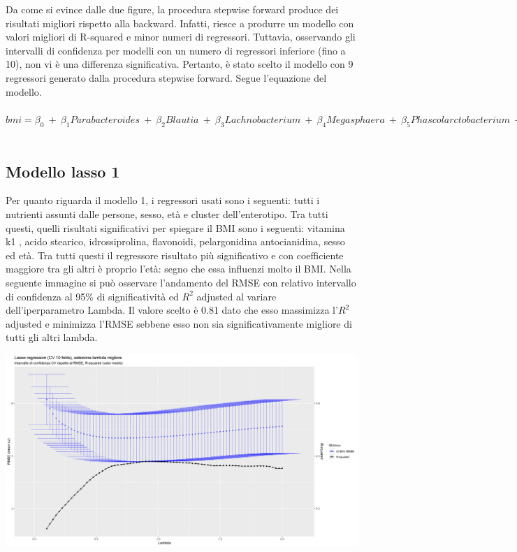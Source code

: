 Da come si evince dalle due figure, la procedura stepwise forward produce dei risultati migliori rispetto alla backward. Infatti, riesce  a produrre un modello con valori migliori di R-squared e minor numeri di regressori. Tuttavia, osservando gli intervalli di confidenza per modelli con un numero di regressori inferiore (fino a 10), non vi è una differenza significativa. Pertanto, è stato scelto il modello con 9 regressori generato dalla procedura stepwise forward. Segue l'equazione del modello. 
\\
\\
$bmi = \beta_0 \:+\: \beta_1 Parabacteroides\: +\: \beta_2 Blautia \:+\: \beta_3 Lachnobacterium\: +\: \beta_4 Megasphaera \: +\: \beta_5 Phascolarctobacterium \: +\: \beta_6 Veilonella\: +\: \beta_7 Catenibacterium \:+\: \beta_8 age\:+\: \beta_9 sex\: +\: \epsilon$
\\
\\
\subsection{Modello lasso 1}
Per quanto riguarda il modello 1, i regressori usati sono i seguenti: tutti i nutrienti assunti dalle persone, sesso, età e cluster dell’enterotipo. Tra tutti questi, quelli risultati significativi per spiegare il BMI sono i seguenti: vitamina k1 , acido stearico, idrossiprolina, flavonoidi, pelargonidina antocianidina, sesso ed età. Tra tutti questi il regressore risultato più significativo e con coefficiente maggiore tra gli altri è proprio l’età: segno che essa influenzi molto il BMI.
Nella seguente immagine si può osservare l’andamento del RMSE con relativo intervallo di confidenza al 95\% di significatività ed $R^2$ adjusted al variare dell’iperparametro Lambda.
Il valore scelto è 0.81 dato che esso massimizza l’$R^2$ adjusted e minimizza l’RMSE sebbene esso non sia significativamente migliore di tutti gli altri lambda. 

\begin{Figure}
    \centering
    \includegraphics[width=17cm,keepaspectratio]{images/lasso_demo_nutriens_cluster.png}
  \end{Figure}

